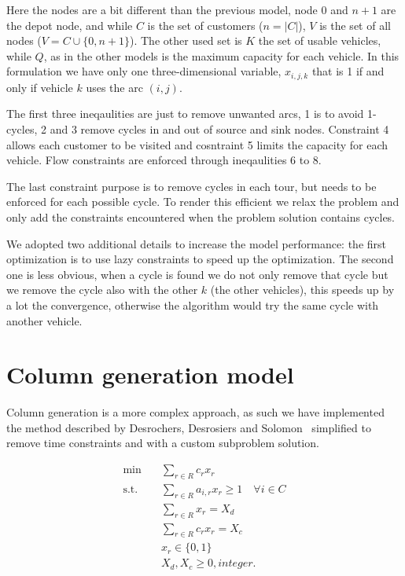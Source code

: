 Here the nodes are a bit different than the previous model, node $0$ and $n+1$ are the depot node, and while $C$ is the set of customers ($n = |C|$), $V$ is the set of all nodes ($V = C \cup \{0, n+1\}$). The other used set is $K$ the set of usable vehicles, while $Q$, as in the other models is the maximum capacity for each vehicle. In this formulation we have only one three-dimensional variable, $x_{i,j,k}$ that is 1 if and only if vehicle $k$ uses the arc $(i,j)$.

The first three ineqaulities are just to remove unwanted arcs, 1 is to avoid 1-cycles, 2 and 3 remove cycles in and out of source and sink nodes. Constraint 4 allows each customer to be visited and cosntraint 5 limits the capacity for each vehicle. Flow constraints are enforced through ineqaulities 6 to 8.

The last constraint purpose is to remove cycles in each tour, but needs to be enforced for each possible cycle. To render this efficient we relax the problem and only add the constraints encountered when the problem solution contains cycles.

We adopted two additional details to increase the model performance: the first optimization is to use lazy constraints to speed up the optimization. The second one is less obvious, when a cycle is found we do not only remove that cycle but we remove the cycle also with the other $k$ (the other vehicles), this speeds up by a lot the convergence, otherwise the algorithm would try the same cycle with another vehicle.

\section{Column generation model}
\label{column-generation-model}

Column generation is a more complex approach, as such we have implemented the method described by Desrochers, Desrosiers and Solomon~\cite{desrochers1992new} simplified to remove time constraints and with a custom subproblem solution.

\begin{align*}
  \min \quad & \sum_{r \in R}{c_rx_r}\\
  \textrm{s.t.} \quad
    &\sum_{r \in R} {a_{i, r}x_r} \geq 1 \quad \forall i \in C \tag{1}\\
    &\sum_{r \in R} {x_r} = X_d \tag{2}\\
    &\sum_{r \in R} {c_rx_r} = X_c \tag{3}\\
    &x_{r} \in \{0,1\} \\
    &X_d, X_c \geq 0, integer.\\
\end{align*}


